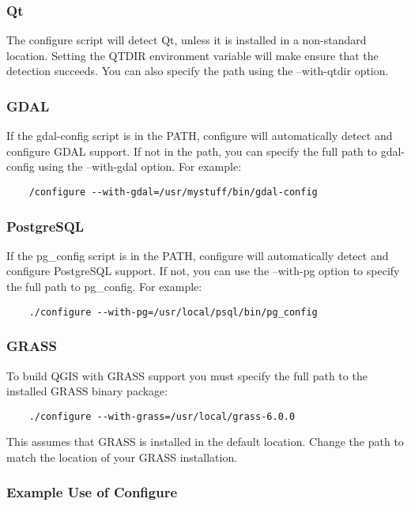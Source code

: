 \subsubsection{Qt}
  
The configure script will detect Qt, unless it is installed in a  
non-standard location. Setting the QTDIR environment variable will 
make ensure that the detection succeeds. You can also specify the path
using the --with-qtdir option. 
  
\subsubsection{GDAL}
 
 If the gdal-config script is in the PATH, configure will automatically
 detect and configure GDAL support. If not in the path, you can specify
 the full path to gdal-config using the --with-gdal option. For example:
  
  \begin{verbatim}
    /configure --with-gdal=/usr/mystuff/bin/gdal-config
  \end{verbatim}
  
\subsubsection{PostgreSQL}
  
If the pg\_config script is in the PATH, configure will automatically
detect and configure PostgreSQL support. If not, you can use the
--with-pg option to specify the full path to pg\_config. For example:
 
\begin{verbatim}
    ./configure --with-pg=/usr/local/psql/bin/pg_config
\end{verbatim}

\subsubsection{GRASS}
To build QGIS with GRASS support you must specify the full path to the
installed GRASS binary package:

\begin{verbatim}
    ./configure --with-grass=/usr/local/grass-6.0.0
\end{verbatim}

This assumes that GRASS is installed in the default location. Change the
path to match the location of your GRASS installation.
 
\subsubsection{Example Use of Configure}
  
